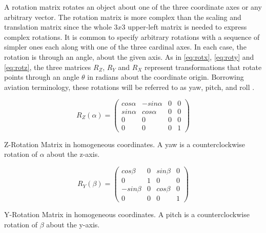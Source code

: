 \noindent A rotation matrix rotates an object about one of the three coordinate axes or any arbitrary vector. The rotation matrix is more complex than the scaling and translation matrix since the whole $3x3$ upper-left matrix is needed to express complex rotations. It is common to specify arbitrary rotations with a sequence of simpler ones each along with one of the three cardinal axes. In each case, the rotation is through an angle, about the given axis. As in \ref{eq:rotx}, \ref{eq:roty} and \ref{eq:rotz}, the three matrices $R_Z$, $R_Y$ and $R_X$ represent transformations that rotate points through an angle $\theta$ in radians about the coordinate origin. Borrowing aviation terminology, these rotations will be referred to as yaw, pitch, and roll \cite[]{Yawpitch48:online}.

\begin{Equation}[!htb]
	\centering
	\begin{equation} \label{eq:rotx}
	R_Z(\alpha) =
        \begin{pmatrix}
            cos\alpha & -sin\alpha & 0 & 0 \\
            sin\alpha & cos\alpha & 0 & 0 \\
            0 & 0 & 0 & 0 \\
            0 & 0 & 0 & 1 
        \end{pmatrix}
	\end{equation}
	\caption[Z-Rotation Matrix in homogeneous coordinates.]{Z-Rotation Matrix in homogeneous coordinates. A yaw is a counterclockwise rotation of $\alpha$ about the z-axis.}
\end{Equation}

\begin{Equation}[!htb]
	\centering
	\begin{equation} \label{eq:roty}
	R_Y(\beta) =
        \begin{pmatrix}
            cos\beta & 0 & sin\beta & 0 \\
            0 & 1 & 0 & 0 \\
            -sin\beta & 0 & cos\beta & 0 \\
            0 & 0 & 0 & 1 
        \end{pmatrix}
	\end{equation}
	\caption[Y-Rotation Matrix in homogeneous coordinates.]{Y-Rotation Matrix in homogeneous coordinates. A pitch is a counterclockwise rotation of $\beta$ about the y-axis.}
\end{Equation}

